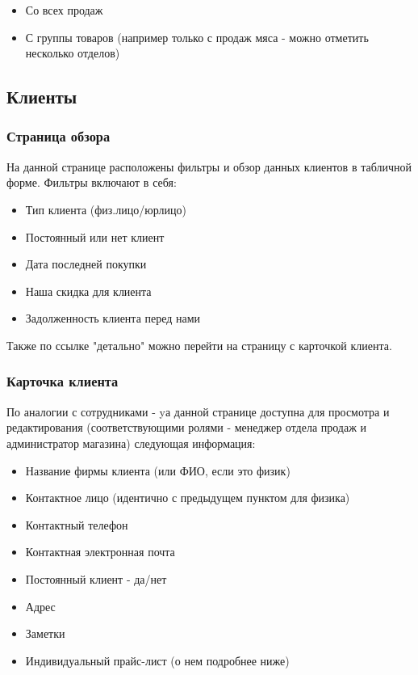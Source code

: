 \documentclass[DIV=calc, paper=a4, fontsize=11pt]{scrartcl} %
\begin{document}
\begin{itemize}
	\item Со всех продаж
	\item С группы товаров (например только с продаж мяса - можно отметить несколько отделов)
\end{itemize}

\subsection{Клиенты}

\subsubsection{Страница обзора}

На данной странице расположены фильтры и обзор данных клиентов в табличной форме. Фильтры включают в себя:

\begin{itemize}
	\item Тип клиента (физ.лицо/юрлицо)
	\item Постоянный или нет клиент
	\item Дата последней покупки
	\item Наша скидка для клиента
	\item Задолженность клиента перед нами
\end{itemize}

Также по ссылке "детально" можно перейти на страницу с карточкой клиента.

\subsubsection{Карточка клиента}

По аналогии с сотрудниками - yа данной странице доступна для просмотра и редактирования (соответствующими ролями - менеджер отдела продаж и администратор магазина) следующая информация: 

\begin{itemize}
	\item Название фирмы клиента (или ФИО, если это физик)
	\item Контактное лицо (идентично с предыдущем пунктом для физика)
	\item Контактный телефон
	\item Контактная электронная почта
	\item Постоянный клиент - да/нет
	\item Адрес 
	\item Заметки
	\item Индивидуальный прайс-лист (о нем подробнее ниже)
\end{itemize}
\end{document}
